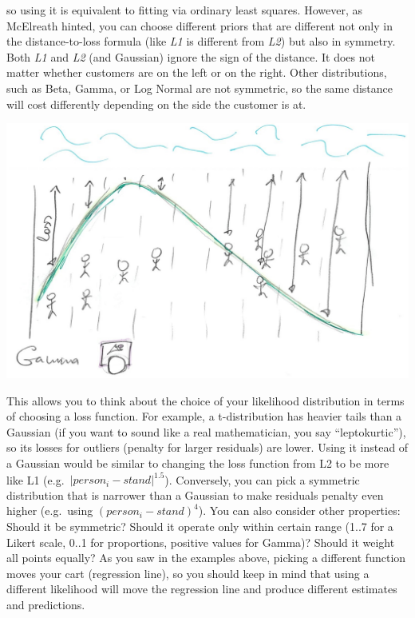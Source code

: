 \documentclass[
]{book}
\begin{document}
so using it is equivalent to fitting via ordinary least squares. However, as McElreath hinted, you can choose different priors that are different not only in the distance-to-loss formula (like \emph{L1} is different from \emph{L2}) but also in symmetry. Both \emph{L1} and \emph{L2} (and Gaussian) ignore the sign of the distance. It does not matter whether customers are on the left or on the right. Other distributions, such as Beta, Gamma, or Log Normal are not symmetric, so the same distance will cost differently depending on the side the customer is at.

\begin{center}\includegraphics[width=1\linewidth]{images/loss-functions-Gamma} \end{center}

This allows you to think about the choice of your likelihood distribution in terms of choosing a loss function. For example, a t-distribution has heavier tails than a Gaussian (if you want to sound like a real mathematician, you say ``leptokurtic''), so its losses for outliers (penalty for larger residuals) are lower. Using it instead of a Gaussian would be similar to changing the loss function from L2 to be more like L1 (e.g.~\(|person_i - stand|^{1.5}\)). Conversely, you can pick a symmetric distribution that is narrower than a Gaussian to make residuals penalty even higher (e.g.~using \((person_i - stand)^{4}\)). You can also consider other properties: Should it be symmetric? Should it operate only within certain range (1..7 for a Likert scale, 0..1 for proportions, positive values for Gamma)? Should it weight all points equally? As you saw in the examples above, picking a different function moves your cart (regression line), so you should keep in mind that using a different likelihood will move the regression line and produce different estimates and predictions.
\end{document}
